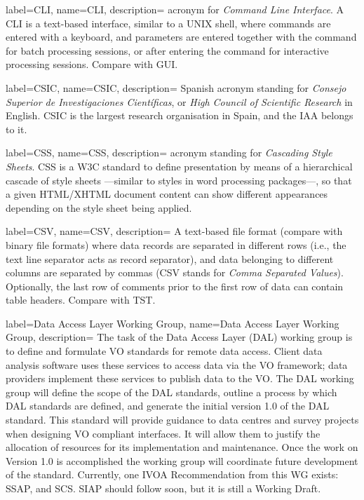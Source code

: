 {
    label={CLI},
    name={CLI},
    description={
    	acronym for \emph{Command Line Interface}. A CLI is a
        text-based interface, similar to a UNIX shell, where commands
        are entered with a keyboard, and parameters are entered
        together with the command for batch processing sessions, or
        after entering the command for interactive processing sessions.
        Compare with \gls{GUI}.
    }
}

{
    label={CSIC},
    name={CSIC},
    description={
    	Spanish acronym standing for \emph{Consejo Superior de
        Investigaciones Científicas}, or \emph{High Council of
        Scientific Research} in English. CSIC is the largest research
        organisation in Spain, and the \gls{IAA} belongs to it.
    }
}

{
    label={CSS},
    name={CSS},
    description={
    	acronym standing for \emph{Cascading Style Sheets}. CSS is a
        \gls{W3C} standard to define presentation by means of a
        hierarchical cascade of style sheets —similar to styles in word
        processing packages—, so that a given \gls{HTML}/\gls{XHTML}
        document content can show different appearances depending on
        the style sheet being applied.
    }
}

{
    label={CSV},
    name={CSV},
    description={
    	A \gls{text-based file format} (compare with \gls{binary file
        formats}) where data records are separated in different rows
        (i.e., the text line separator acts as record separator), and
        data belonging to different columns are separated by commas
        (CSV stands for \emph{Comma Separated Values}). Optionally, the
        last row of comments prior to the first row of data can contain
        table headers. Compare with \gls{TST}.
    }
}

{
    label={Data Access Layer Working Group},
    name={Data Access Layer Working Group},
    description={
    	The task of the Data Access Layer (DAL) working group is to
        define and formulate VO standards for remote data access.
        Client data analysis software uses these services to access
        data via the VO framework; data providers implement these
        services to publish data to the VO. The DAL working group will
        define the scope of the DAL standards, outline a process by
        which DAL standards are defined, and generate the initial
        version 1.0 of the DAL standard. This standard will provide
        guidance to data centres and survey projects when designing VO
        compliant interfaces. It will allow them to justify the
        allocation of resources for its implementation and maintenance.
        Once the work on Version 1.0 is accomplished the working group
        will coordinate future development of the standard. Currently,
        one \gls{IVOA} \gls{Recommendation} from this WG exists:
        \gls{SSAP}, and \gls{SCS}. \gls{SIAP} should follow soon, but
        it is still a \gls{Working Draft}.
    }
}

